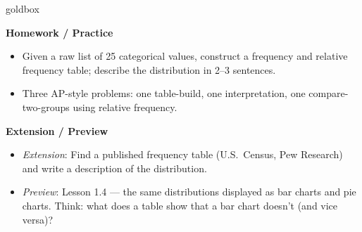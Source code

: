 \documentclass[10pt]{article}
\begin{document}
\begin{skillbox}{goldbox}
\begin{minipage}[t]{0.48\linewidth}
    \textbf{Homework / Practice}
    \begin{itemize}
        \item Given a raw list of 25 categorical values, construct a frequency and
              relative frequency table; describe the distribution in 2--3 sentences.
        \item Three AP-style problems: one table-build, one interpretation, one
              compare-two-groups using relative frequency.
    \end{itemize}
\end{minipage}
\hfill
\begin{minipage}[t]{0.48\linewidth}
    \textbf{Extension / Preview}
    \begin{itemize}
        \item \textit{Extension}: Find a published frequency table (U.S.\ Census,
              Pew Research) and write a description of the distribution.
        \item \textit{Preview}: Lesson 1.4 --- the same distributions displayed as
              bar charts and pie charts. Think: what does a table show that a bar
              chart doesn't (and vice versa)?
    \end{itemize}
\end{minipage}
\end{skillbox}
\end{document}

